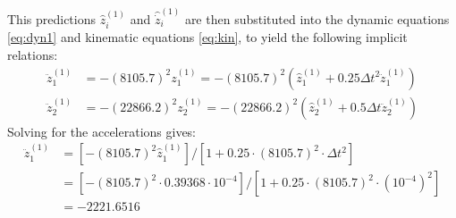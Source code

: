 \documentclass[12pt]{article}
\begin{document}
This predictions $\hat{z}_i^{(1)}$ and $\hat{\dot{z}}_i^{(1)}$ are then substituted into the dynamic equations \eqref{eq:dyn1} and kinematic equations \eqref{eq:kin}, to yield the following implicit relations:
\begin{equation*}
    \begin{aligned}
        \ddot{z}_1^{(1)} & = - (8105.7)^2 z_1^{(1)} = - (8105.7)^2 (\hat{z}_1^{(1)}+ 0.25 \Delta t^2\ddot{z}_1^{(1)} ) \\
        \ddot{z}_2^{(1)} & = -(22866.2)^2 z_2^{(1)} = - (22866.2)^2( \hat{z}_2^{(1)}+ 0.5 \Delta t \ddot{z}_2^{(1)}  )
    \end{aligned}
\end{equation*}
Solving for the accelerations gives:
\begin{equation*}
    \begin{aligned}
        \ddot{z}_1^{(1)} & = \left[- (8105.7)^2 \hat{z}_1^{(1)} \right] \big/ \left[ 1 + 0.25 \cdot (8105.7)^2 \cdot \Delta t^2 \right]              \\
                         & = \left[- (8105.7)^2 \cdot 0.39368 \cdot 10^{-4} \right] \big/ \left[ 1 + 0.25 \cdot (8105.7)^2 \cdot (10^{-4})^2 \right] \\
                         & = -2221.6516
    \end{aligned}
\end{equation*}
\end{document}
